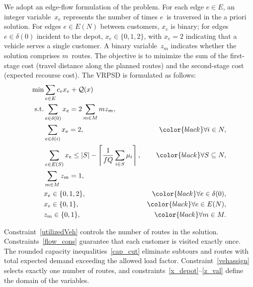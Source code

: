 \documentclass{article}
\newcommand{\rev}[1]{{\color{black}#1}}
\begin{document}
We adopt an edge-flow formulation of the problem. For each edge $e \in E$, an integer variable~$x_e$ represents the number of times $e$~is traversed in the a priori solution. For edges $e \in E(N)$ between customers, $x_e$ is binary; for edges $e \in \delta(0)$ incident to the depot, $x_e \in \{0,1,2\}$, with $x_e = 2$ indicating that a vehicle serves a single customer. A binary variable~$z_m$ indicates whether the solution comprises $m$~routes. The objective is to minimize the sum of the first-stage cost (travel distance along the planned routes) and the second-stage cost (expected recourse cost). The VRPSD is formulated as follows:
\begingroup
\allowdisplaybreaks
\begin{alignat}{2}
\min & \sum_{e \in E} c_{e}x_{e} + \mathcal{Q}(x) \label{objective} \\
\text{s.t.} &     \sum_{e \in \delta(0)}x_{e} = 2\sum_{m \in M}mz_{m}, \label{utilizedVeh} \\
    & \sum_{e \in \delta(i)}x_{e} = 2, &  \rev{\forall} i \in N, \label{flow_cons} \\
    & \sum_{e\in E(S)}x_{e} \leq |S| - \left \lceil \frac{1}{fQ}\sum_{i \in S}\mu_{i} \right \rceil, &   \rev{\forall} S \subseteq N,\label{cap_cut} \\
    & \sum_{m \in M} z_{m} = 1, \label{vehassign} \\
    & x_{e} \in \{0, 1, 2\}, & \rev{\forall} e \in \delta(0), \label{x_depot} \\
    & x_{e} \in \{0, 1\}, & \rev{\forall} e \in E(N), \label{x_custs} \\
    & z_{m} \in \{0, 1\}, & \rev{\forall} m \in M. \label{z_val}
\end{alignat}
\endgroup
 
Constraint~\eqref{utilizedVeh} controls the number of routes in the solution. Constraints~\eqref{flow_cons} guarantee that each customer is visited exactly once. The rounded capacity inequalities~\eqref{cap_cut} eliminate subtours and routes with total expected demand exceeding the allowed load factor. Constraint~\eqref{vehassign} selects exactly one number of routes, and constraints~\eqref{x_depot}--\eqref{z_val} define the domain of the variables.
 
\end{document}
